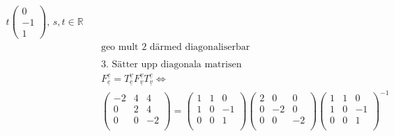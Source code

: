 \begin{align*}
  t\begin{pmatrix} 0 \\ -1 \\ 1 \end{pmatrix}, \, s,t\in\mathbb{R} \\
  &\quad  \text{geo mult 2 därmed diagonaliserbar } \\
  &\quad  \\
  &\quad  \text{3. Sätter upp diagonala matrisen} \\
  &\quad  {F}^{\underline{e}}_{\underline{e}} =
  {T}^{\underline{v}}_{\underline{e}} {F}^{\underline{v}}_{\underline{v}} {T}^{\underline{e}}_{\underline{v}}
  \Leftrightarrow{} \\
  &\quad
  \left(\begin{array}{ccc}
   -2 & 4 & 4  \\
    0 & 2 & 4  \\
    0 & 0 & -2 \\
  \end{array}\right) =
  \left(\begin{array}{ccc}
    1 & 1 &  0  \\
    1 & 0 & -1  \\
    0 & 0 &  1  \\
  \end{array}\right)
  \left(\begin{array}{ccc}
    2 &  0 &  0  \\
    0 & -2 &  0  \\
    0 &  0 & -2 \\
  \end{array}\right)
  \left(\begin{array}{ccc}
    1 & 1 &  0 \\
    1 & 0 & -1 \\
    0 & 0 &  1 \\
  \end{array}\right)^{-1} \\
\end{align*}



\newpage

